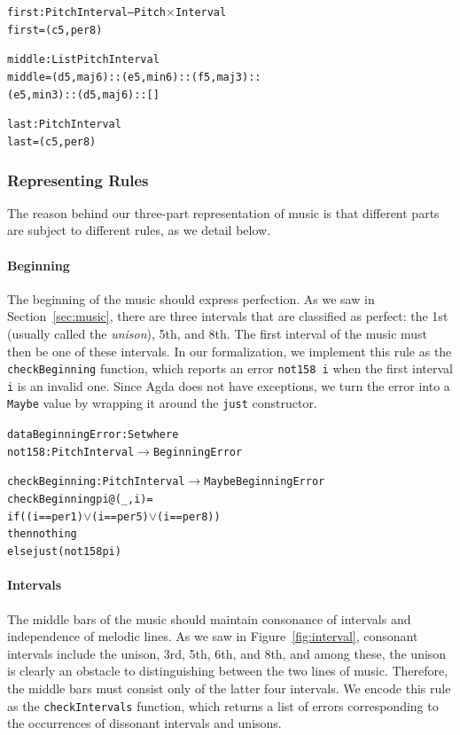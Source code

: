 \begin{alltt}  
first : PitchInterval -- Pitch \(\times\) Interval
first = (c 5 , per8)

middle : List PitchInterval
middle = (d 5 , maj6) :: (e 5 , min6) :: (f 5 , maj3) ::
         (e 5 , min3) :: (d 5 , maj6) :: []

last : PitchInterval
last = (c 5 , per8)
\end{alltt}

\subsubsection{Representing Rules}

The reason behind our three-part representation of music is that
different parts are subject to different rules, as we detail below.

\paragraph{Beginning}

The beginning of the music should express perfection.
As we saw in Section~\ref{sec:music}, there are three intervals that
are classified as perfect: the 1st (usually called the \emph{unison}),
5th, and 8th.
The first interval of the music must then be one of these intervals.
In our formalization, we implement this rule as the
\texttt{checkBeginning} function, which reports an error
\texttt{not158 i} when the first interval \texttt{i} is an invalid one.
Since Agda does not have exceptions, we turn the error into a
\texttt{Maybe} value by wrapping it around the \texttt{just} constructor.

\begin{alltt}
data BeginningError : Set where
  not158 : PitchInterval \(\rightarrow\) BeginningError
  
checkBeginning : PitchInterval \(\rightarrow\) Maybe BeginningError
checkBeginning pi@(_ , i) =
  if ((i == per1) \(\vee\) (i == per5) \(\vee\) (i == per8))
  then nothing
  else just (not158 pi)
\end{alltt}

\paragraph{Intervals}

The middle bars of the music should maintain consonance of intervals
and independence of melodic lines.
As we saw in Figure~\ref{fig:interval}, consonant intervals include
the unison, 3rd, 5th, 6th, and 8th, and among these, the unison is
clearly an obstacle to distinguishing between the two lines of music.
Therefore, the middle bars must consist only of the latter four intervals.
We encode this rule as the \texttt{checkIntervals} function, which
returns a list of errors corresponding to the occurrences of dissonant
intervals and unisons.

